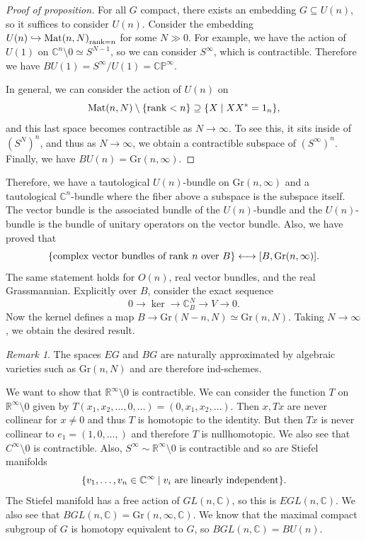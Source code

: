 \documentclass[leqno, openany]{memoir}
\theoremstyle{definition}
\theoremstyle{remark}
\newtheorem{rmk}[thm]{Remark}
\theoremstyle{plain}
\theoremstyle{definition}
\theoremstyle{remark}
\newcommand{\R}{\mathbb{R}}
\newcommand{\C}{\mathbb{C}}
\renewcommand{\P}{\mathbb{P}}
\newcommand{\mr}[1]{\mathrm{#1}}
\begin{document}
\begin{proof}[Proof of proposition] For all $G$ compact, there exists an
    embedding $G \subseteq U(n)$, so it suffices to consider $U(n)$. Consider
    the embedding $U(n) \hookrightarrow { \mr{Mat}(n, N) }_{\rank = n}$ for
    some $N \gg 0$. For example, we have the action of $U(1)$ on $\C^n
    \setminus 0 \simeq S^{N-1}$, so we can consider $S^{\infty}$, which is
    contractible. Therefore we have $BU(1) = S^{\infty} / U(1) =
    \C\P^{\infty}$.

    In general, we can consider the action of $U(n)$ on \[ \mr{Mat}(n, N)
    \setminus \qty{\rank < n} \supseteq \qty{X \mid XX^* = 1_n}, \] and this
    last space becomes contractible as $N \to \infty$. To see this, it sits
    inside of ${(S^N)}^n$, and thus as $N \to \infty$, we obtain a contractible
    subspace of ${(S^{\infty})}^n$. Finally, we have $BU(n) = \mr{Gr}(n,
    \infty)$.  \end{proof}

Therefore, we have a tautological $U(n)$-bundle on $\mr{Gr}(n, \infty)$ and a
tautological $\C^n$-bundle where the fiber above a subspace is the subspace
itself. The vector bundle is the associated bundle of the $U(n)$-bundle and the
$U(n)$-bundle is the bundle of unitary operators on the vector bundle. Also, we
have proved that \[ \qty{\text{complex vector bundles of rank $n$ over $B$}}
\longleftrightarrow [B, \mr{Gr}(n, \infty)]. \] The same statement holds for
$O(n)$, real vector bundles, and the real Grassmannian. Explicitly over $B$,
consider the exact sequence \[ 0 \to \ker \to \C^N_B \to V \to 0. \] Now the
kernel defines a map $B \to \mr{Gr}(N - n, N) \simeq \mr{Gr}(n, N)$. Taking $N
\to \infty$, we obtain the desired result.

\begin{rmk} The spaces $EG$ and $BG$ are naturally approximated by algebraic
varieties such as $\mr{Gr}(n, N)$ and are therefore ind-schemes.  \end{rmk}

We want to show that $\R^{\infty} \setminus 0$ is contractible. We can consider
the function $T$ on $\R^{\infty} \setminus 0$ given by $T(x_1, x_2, \ldots, 0,
\ldots) = (0, x_1, x_2, \ldots)$. Then $x, Tx$ are never collinear for $x \neq
0$ and thus $T$ is homotopic to the identity. But then $Tx$ is never collinear
to $e_1 = (1, 0, \ldots,)$ and therefore $T$ is nullhomotopic. We also see that
$C^{\infty} \setminus 0$ is contractible. Also, $S^{\infty} \sim \R^{\infty}
\setminus 0$ is contractible and so are Stiefel manifolds \[ \qty{v_1, \ldots,
v_n \in \C^{\infty} \mid v_i\ \text{are linearly independent}}. \] The Stiefel
manifold has a free action of $GL(n, \C)$, so this is $EGL(n, \C)$. We also see
that $BGL(n, \C) = \mr{Gr}(n, \infty, \C)$. We know that the maximal compact
subgroup of $G$ is homotopy equivalent to $G$, so $BGL(n, \C) = BU(n)$.
\end{document}
